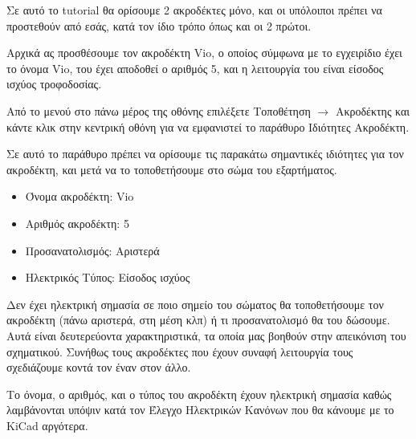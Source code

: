 \documentclass[a4paper]{article}
\begin{document}
\begin{figure}
  \begin{center}
    \label{fig:kicad-main}
  \end{center}
\end{figure}

Σε αυτό το tutorial θα ορίσουμε 2 ακροδέκτες μόνο, και οι υπόλοιποι πρέπει να προστεθούν από εσάς, κατά τον ίδιο τρόπο όπως και οι 2 πρώτοι.

Αρχικά ας προσθέσουμε τον ακροδέκτη Vio, ο οποίος σύμφωνα με το εγχειρίδιο έχει το όνομα Vio, του έχει αποδοθεί ο αριθμός 5, και η λειτουργία του είναι είσοδος ισχύος τροφοδοσίας.

Από το μενού στο πάνω μέρος της οθόνης επιλέξετε Τοποθέτηση $\rightarrow$ Ακροδέκτης και κάντε κλικ στην κεντρική οθόνη για να εμφανιστεί το παράθυρο Ιδιότητες Ακροδέκτη.

\begin{figure}
  \begin{center}
    \label{fig:kicad-main}
  \end{center}
\end{figure}

Σε αυτό το παράθυρο πρέπει να ορίσουμε τις παρακάτω σημαντικές ιδιότητες για τον ακροδέκτη, και μετά να το τοποθετήσουμε στο σώμα του εξαρτήματος.

\begin{itemize}
    \item Όνομα ακροδέκτη: Vio
    \item Αριθμός ακροδέκτη: 5
    \item Προσανατολισμός: Αριστερά
    \item Ηλεκτρικός Τύπος: Είσοδος ισχύος
\end{itemize}

Δεν έχει ηλεκτρική σημασία σε ποιο σημείο του σώματος θα τοποθετήσουμε τον ακροδέκτη (πάνω αριστερά, στη μέση κλπ) ή τι προσανατολισμό θα του δώσουμε. Αυτά είναι δευτερεύοντα χαρακτηριστικά, τα οποία μας βοηθούν στην απεικόνιση του σχηματικού. Συνήθως τους ακροδέκτες που έχουν συναφή λειτουργία τους σχεδιάζουμε κοντά τον έναν στον άλλο.

Το όνομα, ο αριθμός, και ο τύπος του ακροδέκτη έχουν ηλεκτρική σημασία καθώς λαμβάνονται υπόψιν κατά τον Έλεγχο Ηλεκτρικών Κανόνων που θα κάνουμε με το \textenglish{KiCad} αργότερα.
\end{document}
